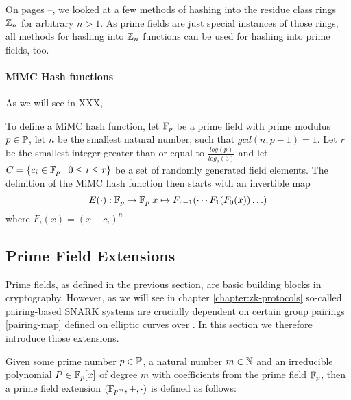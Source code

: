 On pages \pageref{hashing-start}--\pageref{hashing-end}, we looked at a few methods of hashing into the residue class rings $\mathbb{Z}_n$ for arbitrary $n>1$. As prime fields are just special instances of those rings, all methods for hashing into $\mathbb{Z}_n$ functions can be used for hashing into prime fields, too.
\paragraph{MiMC Hash functions} As we will see in XXX, 

To define a MiMC hash function, let $\mathbb{F}_p$ be a prime field with prime modulus $p\in\mathbb{P}$, let $n$ be the smallest natural number, such that  $gcd(n, p-1) = 1$. Let $r$ be the smallest integer greater than or equal to $\frac{log(p)}{log_2(3)}$ and let $C=\{c_i\in \mathbb{F}_p \;|\; 0\leq i \leq r\}$ be a set of randomly generated field elements. The definition of the MiMC hash function then starts with an invertible map
\begin{equation}
E(\cdot) : \mathbb{F}_p \to \mathbb{F}_p\; x \mapsto F_{r-1}(\cdots F_1(F_0(x))\ldots)
\end{equation}
where $F_i(x)= (x+c_i)^n$


\subsection{Prime Field Extensions}\label{field-extension}
Prime fields, as defined in the previous section, are basic building blocks in cryptography. However, as we will see in chapter \ref{chapter:zk-protocols} so-called pairing-based SNARK systems are crucially dependent on certain group pairings \ref{pairing-map} defined on elliptic curves over . In this section we therefore introduce those extensions.

Given some prime number $p\in \mathbb{P}$, a natural number $m\in\mathbb{N}$ and an irreducible polynomial $P\in \mathbb{F}_p[x]$ of degree $m$ with coefficients from the prime field $\mathbb{F}_p$, then a prime field extension $(\mathbb{F}_{p^m},+,\cdot)$ is defined as follows:

